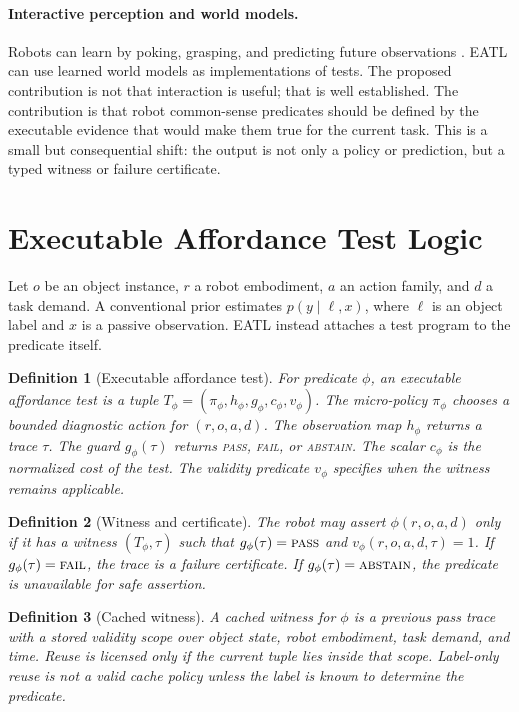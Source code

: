 \documentclass{article}
\newtheorem{definition}{Definition}
\begin{document}
\paragraph{Interactive perception and world models.}
Robots can learn by poking, grasping, and predicting future observations
\citep{agrawal2016poke,pinto2016supersizing,ha2018world}.  EATL can use learned
world models as implementations of tests.  The proposed contribution is not
that interaction is useful; that is well established.  The contribution is that
robot common-sense predicates should be defined by the executable evidence that
would make them true for the current task.  This is a small but consequential
shift: the output is not only a policy or prediction, but a typed witness or
failure certificate.

\section{Executable Affordance Test Logic}

Let $o$ be an object instance, $r$ a robot embodiment, $a$ an action family, and
$d$ a task demand.  A conventional prior estimates $p(y \mid \ell, x)$, where
$\ell$ is an object label and $x$ is a passive observation.  EATL instead
attaches a test program to the predicate itself.

\begin{definition}[Executable affordance test]
For predicate $\phi$, an executable affordance test is a tuple
$T_{\phi}=(\pi_{\phi}, h_{\phi}, g_{\phi}, c_{\phi}, v_{\phi})$.  The
micro-policy $\pi_{\phi}$ chooses a bounded diagnostic action for
$(r,o,a,d)$.  The observation map $h_{\phi}$ returns a trace $\tau$.  The guard
$g_{\phi}(\tau)$ returns \textsc{pass}, \textsc{fail}, or \textsc{abstain}.
The scalar $c_{\phi}$ is the normalized cost of the test.  The validity
predicate $v_{\phi}$ specifies when the witness remains applicable.
\end{definition}

\begin{definition}[Witness and certificate]
The robot may assert $\phi(r,o,a,d)$ only if it has a witness
$(T_{\phi},\tau)$ such that $g_{\phi}(\tau)=\textsc{pass}$ and
$v_{\phi}(r,o,a,d,\tau)=1$.  If $g_{\phi}(\tau)=\textsc{fail}$, the trace is a
failure certificate.  If $g_{\phi}(\tau)=\textsc{abstain}$, the predicate is
unavailable for safe assertion.
\end{definition}

\begin{definition}[Cached witness]
A cached witness for $\phi$ is a previous pass trace with a stored validity
scope over object state, robot embodiment, task demand, and time.  Reuse is
licensed only if the current tuple lies inside that scope.  Label-only reuse is
not a valid cache policy unless the label is known to determine the predicate.
\end{definition}
\end{document}
